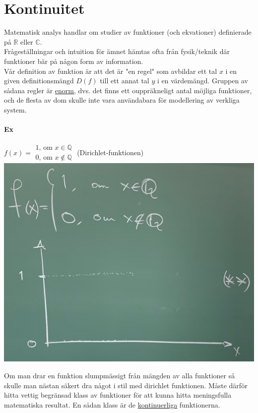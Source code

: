 \section{Kontinuitet}
Matematisk analys handlar om studier av funktioner (och ekvationer) definierade på $\mathbb{R}$ eller $\mathbb{C}$.\\
Frågeställningar och intuition för ämnet hämtas ofta från fysik/teknik där funktioner bär på någon form av information.\\
Vår definition av funktion är att det är "en regel" som avbildar ett tal $x$ i en given definitionsmängd $D(f)$ till ett annat tal $y$ i en värdemängd.
Gruppen av sådana regler är \underline{enorm}, dvs. det finns ett ouppräkneligt antal möjliga funktioner, och de flesta av dom skulle inte vara användabara för modellering av verkliga system.

\paragraph{Ex}
$f(x) = \begin{matrix}
        1\text{, om }x\in\mathbb{Q} \\
        0\text{, om }x\notin\mathbb{Q}
    \end{matrix}$ (Dirichlet-funktionen)\\
\includegraphics[scale=0.1]{lessons/lesson04/imgs/img01.jpg}

Om man drar en funktion slumpmässigt från mängden av alla funktioner så skulle man nästan säkert dra något i stil med dirichlet funktionen.
Måste därför hitta vettig begränsad klass av funktioner för att kunna hitta meningsfulla matematiska resultat.
En sådan klass är de \underline{kontinuerliga} funktionerna.

